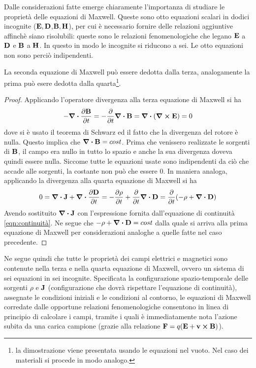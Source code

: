 Dalle considerazioni fatte emerge chiaramente l'importanza di studiare le proprietà delle equazioni di Maxwell.
Queste sono otto equazioni scalari in dodici incognite ($\vb{E},\vb{D}$,$\vb{B},\vb{H}$), per cui è necessario
fornire delle relazioni aggiuntive affinchè siano risolubili: queste sono le relazioni fenomenologiche che legano
$\vb{E}$ a $\vb{D}$ e $\vb{B}$ a $\vb{H}$. In questo in modo le incognite si riducono a sei. Le otto equazioni
non sono perciò indipendenti.
\begin{obs}
    La seconda equazione di Maxwell può essere dedotta dalla terza, analogamente la prima può esere dedotta dalla quarta\footnote{
        la dimostrazione viene presentata usando le equazioni nel vuoto. Nel caso dei materiali si procede in modo analogo.}.
\end{obs}
\begin{proof}
    Applicando l'operatore divergenza alla terza equazione di Maxwell si ha
    \[
        -\div{\pdv{\vb{B}}{t}}=-\pdv{t}\div{\vb{B}}=\div(\curl{\vb{E}})=0
    \]
    dove si è usato il teorema di Schwarz ed il fatto che la divergenza del rotore è nulla.
    Questo implica che $\div{\vb{B}}=cost$. Prima che venissero realizzate le sorgenti di $\vb{B}$, il campo era nullo
    in tutto lo spazio e anche la sua divergenza doveva quindi essere nulla. Siccome tutte le equazioni usate sono
    indipendenti da ciò che accade alle sorgenti, la costante non può che essere $0$.
    In maniera analoga, applicando la divergenza alla quarta equazione di Maxwell si ha
    \[
        0=\div{\vb{J}} + \div{\pdv{\vb{D}}{t}}=-\pdv{\rho}{t} + \pdv{t}\div{\vb{D}}=\pdv{t}(-\rho + \div{\vb{D}})
    \]
    Avendo sostituito $\div{\vb{J}}$ con l'espressione fornita dall'equazione di continuità \eqref{eqn:continuità}.
    Ne segue che $-\rho + \div{\vb{D}}=cost$ dalla quale si arriva alla prima equazione di Maxwell
    per considerazioni analoghe a quelle fatte nel caso precedente.
\end{proof}
Ne segue quindi che tutte le proprietà dei campi elettrici e magnetici sono contenute nella terza
e nella quarta equazione di Maxwell, ovvero un sistema di sei equazioni in sei incognite.
Specificata la configurazione spazio-temporale delle sorgenti $\rho$ e $\vb{J}$ (configurazione che dovrà rispettare
l'equazione di continuità), assegnate le condizioni iniziali e le condizioni al contorno, le equazioni di Maxwell
corredate dalle opportune relazioni fenomenologiche consentono in linea di principio di
calcolare i campi, tramite i quali è immediatamente nota l'azione subita da una carica campione (grazie alla relazione
$\vb{F}=q(\vb{E}+\vb{v}\cp\vb{B})$).


